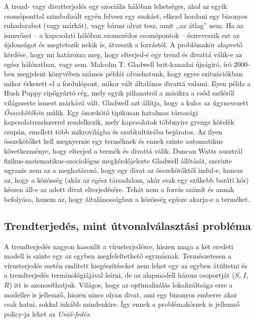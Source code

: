   A trend- vagy divatterjedés egy szociális hálóban lehetséges, ahol az egyik csomóponttal szimbolizált egyén felvesz egy szokást, elkezd hordani egy bizonyos ruhadarabot (vagy márkát), vagy bármi olyat tesz, amit ,,az átlag'' nem. Ha az ismerősei -- a kapcsolati hálóban szomszédos csomópontok -- észreveszik ezt az újdonságot és megtetszik nekik is, átveszik a forrástól. A problémakör alapvető kérdése, hogy mi határozza meg, hogy elterjed-e egy trend és divattá válik-e az egész hálózatban, vagy sem. Malcolm T. Gladwell brit-kanadai újságíró, író 2000-ben megjelent könyvében \cite{The_Tipping_Point} számos példát olvashatunk, hogy egyes szituációkban mikor érkezett el a fordulópont, mikor vált általános divattá valami. Ilyen példa a Hush Puppy cipőgyártó cég, mely egyik pillanatról a másikra a csőd széléről világszerte ismert márkává vált. Gladwell azt állítja, hogy a kulcs az úgynevezett \emph{Összekötőkön} múlik. Egy összekötő tipikusan hatalmas társasági kapcsolatrendszerrel rendelkezik, mely kapcsolatok többnyire gyenge kötelék csupán, emellett több mikrovilágba és szubkultúrába bejáratos. Az ilyen összekötőket kell megnyernie egy terméknek és ennek szinte automatikus következménye, hogy elterjed a termék és divattá válik. Duncan Watts ausztrál fizikus-matematikus-szociológus megkérdőjelezte Gladwell állítását, szerinte ugyanis nem az a meghatározó, hogy egy divat az összekötőktől indul-e, hanem az, hogy a közösség (akár az egész társadalom, akár csak egy szűkebb baráti kör) készen áll-e az adott divat elterjedésére. Tehát nem a forrás számít és annak befolyása, hanem az, hogy általánosságban a közösség egésze akarja-e a terméket.\\

    \subsection{Trendterjedés, mint útvonalválasztási probléma}

    A trendterjedés nagyon hasonlít a vírusterjedésre, hiszen maga a két eredeti modell is szinte egy az egyben megfeleltethető egymásnak. Természetesen a vírusterjedés esetén említett kiegészítéseket nem lehet egy az egyben átültetni és a trendterjedés terminológiájával leírni, de az alapmodell három csoportját ($S$, $I$, $R$) itt is azonosíthatjuk. Világos, hogy az optimalizálás lokalizáltsága erre a modellre is jellemző, hiszen nincs olyan divat, ami egy bizonyos emberre akar csak hatni, sokkal inkább mindenkire. Így ennek a problémakörnek is jellemző policy-ja lehet az \emph{Unió-fedés}.

